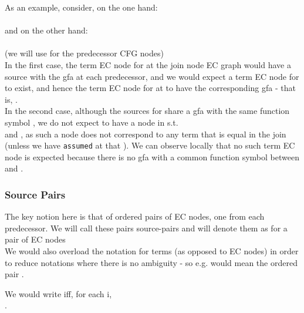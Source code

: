 As an example, consider, on the one hand:\\
\\
and on the other hand:\\
\\
(we will use  for the predecessor CFG nodes)\\
In the first case, the term EC node for  at the join node EC graph  would have a source with the gfa  at each predecessor, and we would expect a term EC node  for  to exist, 
and hence the term EC node for  at  to have the  corresponding gfa - that is, .\\
In the second case, although the sources for  share a gfa with the same function symbol , 
we do not expect to have a node in  s.t. \\
 and ,
as such a node does not correspond to any term that is equal in the join
(unless we have \lstinline{assumed} at  that ).
We can observe locally that no such term EC node is expected because there is no gfa with a common function symbol between 
 and .

\subsubsection*{Source Pairs}
The key notion here is that of ordered pairs of EC nodes, one from each predecessor.
We will call these pairs source-pairs and will denote them as  for a pair of EC nodes \\
We would also overload the notation for terms (as opposed to EC nodes) in order to reduce notations where there is no ambiguity - so e.g.  would mean the ordered pair .

We would write  iff, for each i, \\
.

